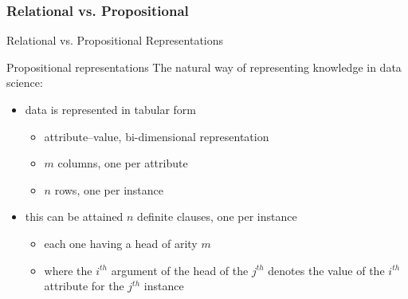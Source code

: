\documentclass[presentation]{beamer}\mode<presentation>{\usetheme{AMSBolognaFC}}
\begin{document}
\subsubsection{Relational vs. Propositional}

\begin{frame}[allowframebreaks]{Relational vs. Propositional Representations}

    \begin{block}{Propositional representations}
        The natural way of representing knowledge in \alert{data science}:
        \begin{itemize}
            \item data is represented in \alert{tabular form}
            \begin{itemize}
                \item \alert{attribute--value}, bi-dimensional representation
                \item $m$ columns, one per attribute
                \item $n$ rows, one per instance
            \end{itemize}

            \item this can be attained $n$ definite clauses, one per instance
            \begin{itemize}
                \item each one having a head of arity $m$
                \item where the $i^{th}$ argument of the head of the $j^{th}$ denotes the value of the $i^{th}$ attribute for the $j^{th}$ instance
            \end{itemize}
        \end{itemize}
    \end{block}


\end{frame}
\end{document}
